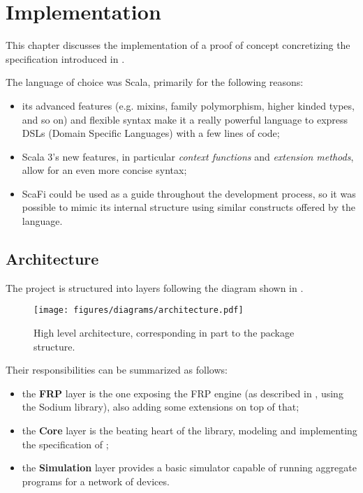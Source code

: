 \chapter{Implementation}
\label{chap:implementation}

This chapter discusses the implementation of a proof of concept concretizing the specification introduced in .

The language of choice was Scala, primarily for the following reasons:
%
\begin{itemize}
    \item its advanced features (e.g. mixins, family polymorphism, higher kinded types, and so on) and flexible syntax make it a really powerful language to express DSLs (Domain Specific Languages) with a few lines of code;
    \item Scala 3's new features, in particular \textit{context functions} and \textit{extension methods}, allow for an even more concise syntax;
    \item ScaFi could be used as a guide throughout the development process, so it was possible to mimic its internal structure using similar constructs offered by the language.
\end{itemize}

\section{Architecture}
\label{sec:architecture}

The project is structured into layers following the diagram shown in .
%
\begin{figure}
    \centering
    \texttt{[image: figures/diagrams/architecture.pdf]}
    \caption{High level architecture, corresponding in part to the package structure.}
    \label{fig:architecture}
\end{figure}
%
Their responsibilities can be summarized as follows:
%
\begin{itemize}
    \item the \textbf{FRP} layer is the one exposing the FRP engine (as described in , using the Sodium library), also adding some extensions on top of that;
    \item the \textbf{Core} layer is the beating heart of the library, modeling and implementing the specification of ;
    \item the \textbf{Simulation} layer provides a basic simulator capable of running aggregate programs for a network of devices.
\end{itemize}

